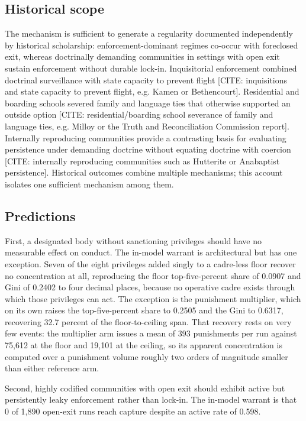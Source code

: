 \documentclass[12pt]{article}
\begin{document}
\subsection{Historical scope}

The mechanism is sufficient to generate a regularity documented independently by historical scholarship: enforcement-dominant regimes co-occur with foreclosed exit, whereas doctrinally demanding communities in settings with open exit sustain enforcement without durable lock-in. Inquisitorial enforcement combined doctrinal surveillance with state capacity to prevent flight [CITE: inquisitions and state capacity to prevent flight, e.g. Kamen or Bethencourt]. Residential and boarding schools severed family and language ties that otherwise supported an outside option [CITE: residential/boarding school severance of family and language ties, e.g. Milloy or the Truth and Reconciliation Commission report]. Internally reproducing communities provide a contrasting basis for evaluating persistence under demanding doctrine without equating doctrine with coercion [CITE: internally reproducing communities such as Hutterite or Anabaptist persistence]. Historical outcomes combine multiple mechanisms; this account isolates one sufficient mechanism among them.

\subsection{Predictions}

First, a designated body without sanctioning privileges should have no measurable effect on conduct. The in-model warrant is architectural but has one exception. Seven of the eight privileges added singly to a cadre-less floor recover no concentration at all, reproducing the floor top-five-percent share of 0.0907 and Gini of 0.2402 to four decimal places, because no operative cadre exists through which those privileges can act. The exception is the punishment multiplier, which on its own raises the top-five-percent share to 0.2505 and the Gini to 0.6317, recovering 32.7 percent of the floor-to-ceiling span. That recovery rests on very few events: the multiplier arm issues a mean of 393 punishments per run against 75,612 at the floor and 19,101 at the ceiling, so its apparent concentration is computed over a punishment volume roughly two orders of magnitude smaller than either reference arm.

Second, highly codified communities with open exit should exhibit active but persistently leaky enforcement rather than lock-in. The in-model warrant is that 0 of 1,890 open-exit runs reach capture despite an active rate of 0.598.
\end{document}
